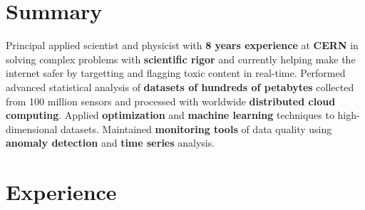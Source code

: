 \documentclass{myfancycv}
\begin{document}
\makeheader
\vspace*{-.35em}

  \vspace*{-0.5em}
\section{Summary}

Principal applied scientist and physicist with {\bf 8 years experience} at {\bf CERN} in solving complex problems with {\bf scientific rigor} and currently helping make the internet safer by targetting and flagging toxic content in real-time. Performed advanced statistical analysis of {\bf datasets of hundreds of petabytes} collected from 100 million sensors and processed with worldwide {\bf distributed cloud computing}. Applied {\bf optimization} and {\bf machine learning} techniques to high-dimensional datasets. Maintained {\bf monitoring tools} of data quality using {\bf anomaly detection} and {\bf time series} analysis.

\section{Experience}
\end{document}
